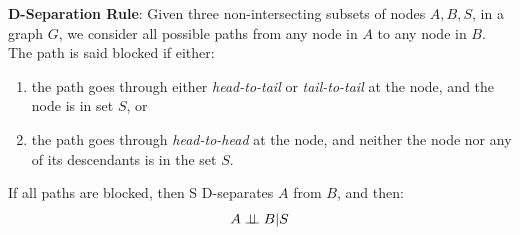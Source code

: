 \begin{theorem}
\textbf{D-Separation Rule}:
 Given three non-intersecting subsets of nodes $A,B,S$, in a graph $G$, we consider all possible paths from any node in $A$ to any node in $B$. The path 
is said blocked if either: 
\begin{enumerate}
 \item the path goes through either \emph{head-to-tail} or \emph{tail-to-tail} at the node, and the node is in set $S$, or
 \item the path goes through \emph{head-to-head} at the node, and neither the node nor any of its descendants is in the set $S$. 
\end{enumerate}
If all paths are blocked, then S D-separates $A$ from $B$, and then:
\begin{equation*}
 A\perp\!\!\!\perp B|S
\end{equation*}
\end{theorem}


